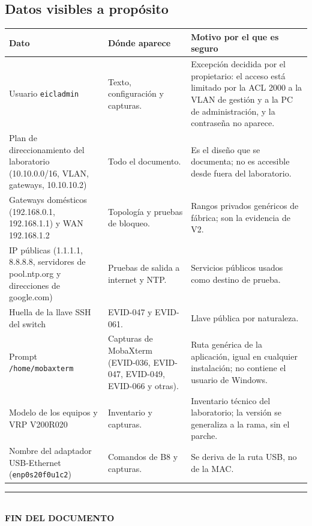 \documentclass[11pt,a4paper]{article}
\newcommand{\cab}{\rowcolor{light}}
\begin{document}
\subsection{Datos visibles a propósito}
{\small
\begin{longtable}{L{3.4cm} L{6.0cm} L{5.6cm}}
  \toprule
  \cab\textbf{Dato} & \textbf{Dónde aparece} & \textbf{Motivo por el que es seguro}\\
  \midrule
  \endhead
  Usuario \texttt{eicladmin} & Texto, configuración y capturas. & Excepción decidida por el propietario: el acceso está limitado por la ACL 2000 a la VLAN de gestión y a la PC de administración, y la contraseña no aparece.\\
  Plan de direccionamiento del laboratorio (10.10.0.0/16, VLAN, gateways, 10.10.10.2) & Todo el documento. & Es el diseño que se documenta; no es accesible desde fuera del laboratorio.\\
  Gateways domésticos (192.168.0.1, 192.168.1.1) y WAN 192.168.1.2 & Topología y pruebas de bloqueo. & Rangos privados genéricos de fábrica; son la evidencia de V2.\\
  IP públicas (1.1.1.1, 8.8.8.8, servidores de pool.ntp.org y direcciones de google.com) & Pruebas de salida a internet y NTP. & Servicios públicos usados como destino de prueba.\\
  Huella de la llave SSH del switch & EVID-047 y EVID-061. & Llave pública por naturaleza.\\
  Prompt \texttt{/home/mobaxterm} & Capturas de MobaXterm (EVID-036, EVID-047, EVID-049, EVID-066 y otras). & Ruta genérica de la aplicación, igual en cualquier instalación; no contiene el usuario de Windows.\\
  Modelo de los equipos y VRP V200R020 & Inventario y capturas. & Inventario técnico del laboratorio; la versión se generaliza a la rama, sin el parche.\\
  Nombre del adaptador USB-Ethernet (\texttt{enp0s20f0u1c2}) & Comandos de B8 y capturas. & Se deriva de la ruta USB, no de la MAC.\\
  \bottomrule
\end{longtable}
}

\begin{center}
  \vspace{-2pt}
  {\color{navy}\rule{0.5\textwidth}{0.6pt}}\\[4pt]
  {\sffamily\bfseries\color{navy}FIN DEL DOCUMENTO}
\end{center}
\end{document}
